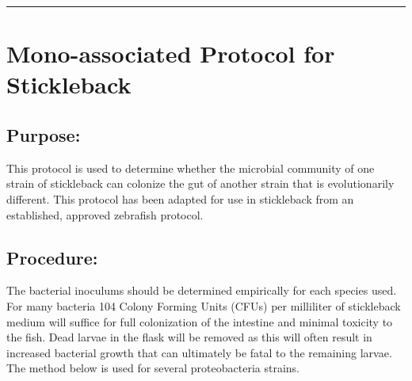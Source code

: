 \documentclass[
]{book}
\begin{document}
\begin{center}\rule{0.5\linewidth}{0.5pt}\end{center}

\hypertarget{mono-associated-protocol-for-stickleback}{%
\section{Mono-associated Protocol for Stickleback}\label{mono-associated-protocol-for-stickleback}}

\hypertarget{purpose-8}{%
\subsection{Purpose:}\label{purpose-8}}

This protocol is used to determine whether the microbial community of one strain of stickleback can colonize the gut of another strain that is evolutionarily different. This protocol has been adapted for use in stickleback from an established, approved zebrafish protocol.

\hypertarget{procedure-18}{%
\subsection{Procedure:}\label{procedure-18}}

The bacterial inoculums should be determined empirically for each species used. For many bacteria 104 Colony Forming Units (CFUs) per milliliter of stickleback medium will suffice for full colonization of the intestine and minimal toxicity to the fish. Dead larvae in the flask will be removed as this will often result in increased bacterial growth that can ultimately be fatal to the remaining larvae. The method below is used for several proteobacteria strains.
\end{document}
